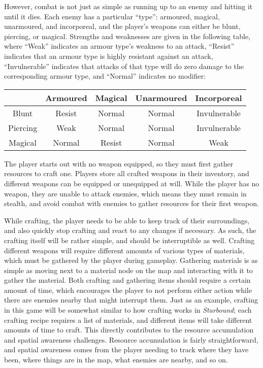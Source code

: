 \documentclass[10pt]{article}
\begin{document}
However, combat is not just as simple as running up to an enemy and hitting it until it dies. Each enemy has a particular
``type'': armoured, magical, unarmoured, and incorporeal, and the player's weapons can either be blunt, piercing, or magical.
Strengths and weaknesses are given in the following table, where ``Weak'' indicates an armour type's weakness to an attack,
``Resist'' indicates that an armour type is highly resistant against an attack, ``Invulnerable'' indicates that attacks of
that type will do zero damage to the corresponding armour type, and ``Normal'' indicates no modifier:
\begin{center}
    \begin{tabular}{|c|c|c|c|c|}
        \hline
        & Armoured & Magical & Unarmoured & Incorporeal\\
        \hline
        Blunt & Resist & Normal & Normal & Invulnerable\\
        Piercing & Weak & Normal & Normal & Invulnerable\\
        Magical & Normal & Resist & Normal & Weak\\
        \hline
    \end{tabular}
\end{center}
The player starts out with no weapon equipped, so they must first gather resources to craft one. Players store all
crafted weapons in their inventory, and different weapons can be equipped or unequipped at will.
While the player has no weapon, they are unable to attack enemies, which means they must remain in stealth,
and avoid combat with enemies to gather resources for their first weapon.

While crafting, the player needs to be able to keep track of their surroundings, and also quickly stop crafting
and react to any changes if necessary. As such, the crafting itself will be rather simple, and should be interruptible
as well. Crafting different weapons will require different amounts of various types of materials, which must be gathered
by the player during gameplay. Gathering materials is as simple as moving next to a material node on the map and interacting
with it to gather the material. Both crafting and gathering items should require a certain amount of time,
which encourages the player to not perform either action while there are enemies nearby that might interrupt them.
Just as an example, crafting in this game will be somewhat similar to how crafting works in \textit{Starbound};
each crafting recipe requires a list of materials, and different items will take different amounts of time to craft.
This directly contributes to the resource accumulation and spatial awareness challenges. Resource accumulation is fairly
straightforward, and spatial awareness comes from the player needing to track where they have been, where things are
in the map, what enemies are nearby, and so on.
\end{document}

